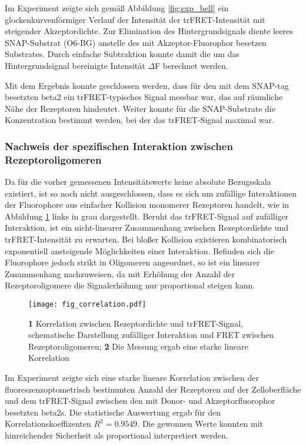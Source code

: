 Im Experiment zeigte sich gemäß Abbildung \ref{fig:exp_bell} ein glockenkurvenförmiger Verlauf der Intensität der trFRET-Intensität mit steigender Akzeptordichte. Zur Elimination des Hintergrundsignals diente leeres SNAP-Substrat (O6-BG) anstelle des mit Akzeptor-Fluorophor besetzen Substrates. Durch einfache Subtraktion konnte damit die um das Hintergrundsignal bereinigte Intensität $\Delta$F berechnet werden. 

Mit dem Ergebnis konnte geschlossen werden, dass für den mit dem SNAP-tag besetzten \gls{beta2} ein trFRET-typisches Signal messbar war, das auf räumliche Nähe der Rezeptoren hindeutet. Weiter konnte für die SNAP-Substrate die Konzentration bestimmt werden, bei der das trFRET-Signal maximal war. 

\subsubsection{Nachweis der spezifischen Interaktion zwischen Rezeptoroligomeren}

Da für die vorher gemessenen Intensitätswerte keine absolute Bezugsskala existiert, ist so noch nicht ausgeschlossen, dass es sich um zufällige Interaktionen der Fluorophore aus einfacher Kollision monomerer Rezeptoren handelt, wie in Abbildung \ref{fig:correlation} links in grau dargestellt. Beruht das trFRET-Signal auf zufälliger Interaktion, ist ein nicht-linearer Zusammenhang zwischen Rezeptordichte und trFRET-Intensität zu erwarten. Bei bloßer Kollision existieren kombinatorisch exponentiell ansteigende Möglichkeiten einer Interaktion.  Befinden sich die Fluorophore jedoch strikt in Oligomeren angeordnet, so ist ein linearer Zusammenhang nachzuweisen, da mit Erhöhung der Anzahl der Rezeptoroligomere die Signalerhöhung nur proportional steigen kann.

\begin{figure}[htbp]
	\centering
    \texttt{[image: fig\_correlation.pdf]}
    \caption{\textbf{1} Korrelation zwischen Rezeptordichte und trFRET-Signal, schematische Darstellung zufälliger Interaktion und FRET zwischen Rezeptoroligomeren; \textbf{2} Die Messung ergab eine starke lineare Korrelation} 
    \label{fig:correlation}
\end{figure}

Im Experiment zeigte sich eine starke lineare Korrelation zwischen der fluoreszenzoptometrisch bestimmten Anzahl der Rezeptoren auf der Zelloberfläche und dem trFRET-Signal zwischen den mit Donor- und Akzeptorfluorophor besetzten \gls{beta2}s. Die statistische Auswertung ergab für den Korrelationskoeffizenten $R^2=0.9549$. Die gewonnen Werte konnten mit hinreichender Sicherheit als proportional interpretiert werden.

